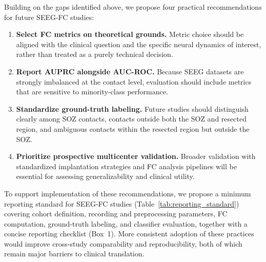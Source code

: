 \documentclass[12pt]{article}
\begin{document}
Building on the gaps identified above, we propose four practical recommendations for future SEEG-FC studies:
\begin{enumerate}
    \item \textbf{Select FC metrics on theoretical grounds.} Metric choice should be aligned with the clinical question and the specific neural dynamics of interest, rather than treated as a purely technical decision.
    \item \textbf{Report AUPRC alongside AUC-ROC.} Because SEEG datasets are strongly imbalanced at the contact level, evaluation should include metrics that are sensitive to minority-class performance.
    \item \textbf{Standardize ground-truth labeling.} Future studies should distinguish clearly among SOZ contacts, contacts outside both the SOZ and resected region, and ambiguous contacts within the resected region but outside the SOZ.
    \item \textbf{Prioritize prospective multicenter validation.} Broader validation with standardized implantation strategies and FC analysis pipelines will be essential for assessing generalizability and clinical utility.
\end{enumerate}

To support implementation of these recommendations, we propose a minimum reporting standard for SEEG-FC studies (Table~\ref{tab:reporting_standard}) covering cohort definition, recording and preprocessing parameters, FC computation, ground-truth labeling, and classifier evaluation, together with a concise reporting checklist (Box~1). More consistent adoption of these practices would improve cross-study comparability and reproducibility, both of which remain major barriers to clinical translation.
\end{document}
